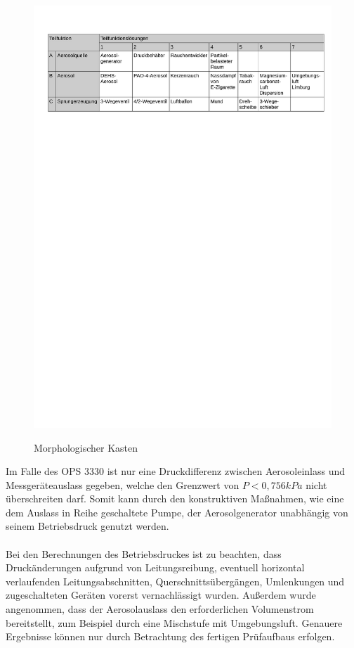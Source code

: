 \begin{figure}[H]
        \myfloatalign
        {\includegraphics[width=.9\linewidth]{gfx/concepts/Morph.pdf}} \quad
        \caption[Morphologischer Kasten]
        {Morphologischer Kasten}
        \label{fig:Morph}
\end{figure}
Im Falle des OPS 3330 ist nur eine Druckdifferenz zwischen Aerosoleinlass und Messger\"{a}teauslass gegeben, welche den Grenzwert von \(P < 0,756 kPa\) nicht \"{u}berschreiten darf. Somit kann durch den konstruktiven Ma{\ss}nahmen, wie eine dem Auslass in Reihe geschaltete Pumpe, der Aerosolgenerator unabh\"{a}ngig von seinem Betriebsdruck genutzt werden.
\\\\
Bei den Berechnungen des Betriebsdruckes ist zu beachten, dass Druck\"{a}nderungen aufgrund von Leitungsreibung, eventuell horizontal verlaufenden Leitungsabschnitten, Querschnitts\"{u}berg\"{a}ngen, Umlenkungen und zugeschalteten Ger\"{a}ten vorerst vernachl\"{a}ssigt wurden. Au{\ss}erdem wurde angenommen, dass der Aerosolauslass den erforderlichen Volumenstrom bereitstellt, zum Beispiel durch eine Mischstufe mit Umgebungsluft. Genauere Ergebnisse k\"{o}nnen nur durch Betrachtung des fertigen Pr\"{u}faufbaus erfolgen.
